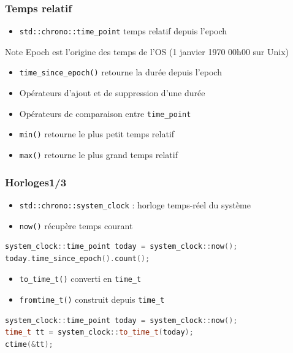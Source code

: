\documentclass[C++.tex]{subfiles}
\begin{document}
\begin{frame}[fragile]
	\frametitle{Temps relatif}
	\begin{itemize}
		\item \lstinline|std::chrono::time_point| temps relatif depuis l'epoch
	\end{itemize}

	\begin{block}{Note}
		Epoch est l'origine des temps de l'OS (1 janvier 1970 00h00 sur Unix)
	\end{block}

	\begin{itemize}
		\item \lstinline|time_since_epoch()| retourne la durée depuis l'epoch
		\item Opérateurs d'ajout et de suppression d'une durée
		\item Opérateurs de comparaison entre \lstinline|time_point|
		\item \lstinline|min()| retourne le plus petit temps relatif
		\item \lstinline|max()| retourne le plus grand temps relatif
	\end{itemize}
\end{frame}

\begin{frame}[fragile]
	\frametitle{Horloges\titlehfill{}1/3}
	\begin{itemize}
		\item \lstinline|std::chrono::system_clock| : horloge temps-réel du système
		\item \lstinline|now()| récupère temps courant
	\end{itemize}

	\begin{lstlisting}[language=C++]
system_clock::time_point today = system_clock::now();
today.time_since_epoch().count();\end{lstlisting}

	\begin{itemize}
		\item \lstinline|to_time_t()| converti en \lstinline|time_t|
		\item \lstinline|fromtime_t()| construit depuis \lstinline|time_t|
	\end{itemize}

	\begin{lstlisting}[language=C++]
system_clock::time_point today = system_clock::now();
time_t tt = system_clock::to_time_t(today);
ctime(&tt);\end{lstlisting}
\end{frame}
\end{document}
